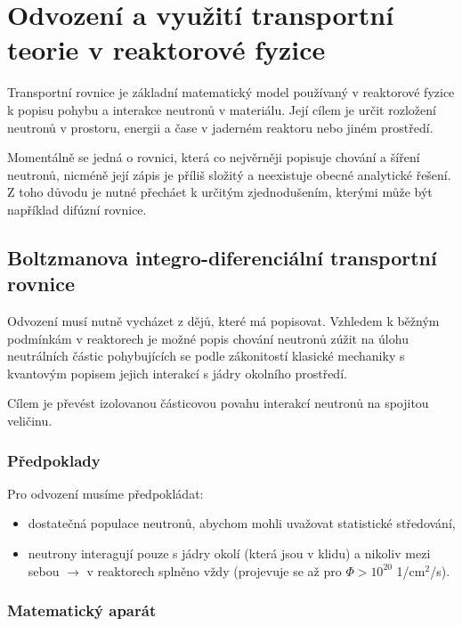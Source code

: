 \section[Transportní rovnice]{Odvození a využití transportní teorie v reaktorové fyzice}

Transportní rovnice je základní matematický model používaný v reaktorové fyzice k popisu pohybu a interakce neutronů v materiálu. Její cílem je určit rozložení neutronů v prostoru, energii a čase v jaderném reaktoru nebo jiném prostředí.

Momentálně se jedná o rovnici, která co nejvěrněji popisuje chování a šíření neutronů, nicméně její zápis je příliš složitý a neexistuje obecné analytické řešení. Z toho důvodu je nutné přecháet k určitým zjednodušením, kterými může být například difúzní rovnice.

\subsection{Boltzmanova integro-diferenciální transportní rovnice}

Odvození musí nutně vycházet z dějů, které má popisovat. Vzhledem k běžným podmínkám v reaktorech je možné popis chování neutronů zúžit na úlohu neutrálních částic pohybujících se podle zákonitostí klasické mechaniky s kvantovým popisem jejich interakcí s jádry okolního prostředí.

Cílem je převést izolovanou částicovou povahu interakcí neutronů na spojitou veličinu.

\subsubsection{Předpoklady}

Pro odvození musíme předpokládat:

\begin{itemize}
  \item dostatečná populace neutronů, abychom mohli uvažovat statistické středování,
  \item neutrony interagují pouze s jádry okolí (která jsou v klidu) a nikoliv mezi sebou $\rightarrow$ v reaktorech splněno vždy (projevuje se až pro $\Phi > 10^{20}$ 1/cm$^2$/s).
\end{itemize}

\subsubsection{Matematický aparát}

